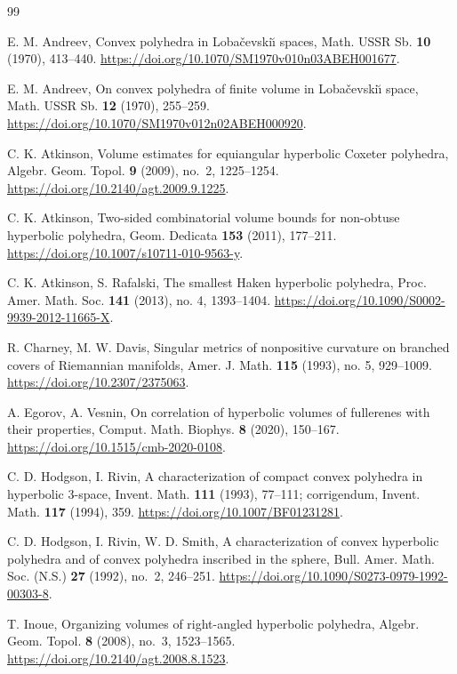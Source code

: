 \documentclass[12pt,a4paper]{article}
\theoremstyle{definition}
\begin{document}
\begin{thebibliography}{99}

E. M. Andreev,
Convex polyhedra in Loba\v{c}evski\u{\i} spaces,
Math. USSR Sb. \textbf{10} (1970), 413--440.
\url{https://doi.org/10.1070/SM1970v010n03ABEH001677}.

E. M. Andreev,
On convex polyhedra of finite volume in Loba\v{c}evski\u{\i} space,
Math. USSR Sb. \textbf{12} (1970), 255--259.
\url{https://doi.org/10.1070/SM1970v012n02ABEH000920}.

C. K. Atkinson,
Volume estimates for equiangular hyperbolic Coxeter polyhedra,
Algebr. Geom. Topol. \textbf{9} (2009), no.~2, 1225--1254.
\url{https://doi.org/10.2140/agt.2009.9.1225}.

C. K. Atkinson,
Two-sided combinatorial volume bounds for non-obtuse hyperbolic polyhedra,
Geom. Dedicata \textbf{153} (2011), 177--211.
\url{https://doi.org/10.1007/s10711-010-9563-y}.

C. K. Atkinson, S. Rafalski,
The smallest Haken hyperbolic polyhedra,
Proc. Amer. Math. Soc. \textbf{141} (2013), no. 4, 1393--1404.
\url{https://doi.org/10.1090/S0002-9939-2012-11665-X}.

R. Charney, M. W. Davis,
Singular metrics of nonpositive curvature on branched covers of Riemannian
manifolds,
Amer. J. Math. \textbf{115} (1993), no. 5, 929--1009.
\url{https://doi.org/10.2307/2375063}.

A. Egorov, A. Vesnin,
On correlation of hyperbolic volumes of fullerenes with their properties,
Comput. Math. Biophys. \textbf{8} (2020), 150--167.
\url{https://doi.org/10.1515/cmb-2020-0108}.

C. D. Hodgson, I. Rivin,
A characterization of compact convex polyhedra in hyperbolic \(3\)-space,
Invent. Math. \textbf{111} (1993), 77--111;
corrigendum, Invent. Math. \textbf{117} (1994), 359.
\url{https://doi.org/10.1007/BF01231281}.

C. D. Hodgson, I. Rivin, W. D. Smith,
A characterization of convex hyperbolic polyhedra and of convex polyhedra inscribed in the sphere,
Bull. Amer. Math. Soc. (N.S.) \textbf{27} (1992), no.~2, 246--251.
\url{https://doi.org/10.1090/S0273-0979-1992-00303-8}.

T. Inoue,
Organizing volumes of right-angled hyperbolic polyhedra,
Algebr. Geom. Topol. \textbf{8} (2008), no.~3, 1523--1565.
\url{https://doi.org/10.2140/agt.2008.8.1523}.


\end{thebibliography}
\end{document}
